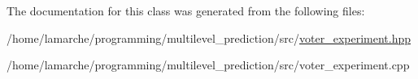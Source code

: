 The documentation for this class was generated from the following files\-:\begin{DoxyCompactItemize}
\item 
/home/lamarche/programming/multilevel\-\_\-prediction/src/\hyperlink{voter__experiment_8hpp}{voter\-\_\-experiment.\-hpp}\item 
/home/lamarche/programming/multilevel\-\_\-prediction/src/voter\-\_\-experiment.\-cpp\end{DoxyCompactItemize}
